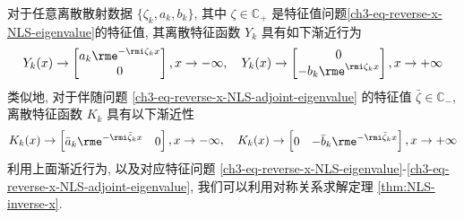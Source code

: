 对于任意离散散射数据 $ \{ \zeta_{k}, a_{k}, b_{k} \} $, 其中 $ \zeta \in \mathbb{C_{+}} $ 是特征值问题\eqref{ch3-eq-reverse-x-NLS-eigenvalue}的特征值, 其离散特征函数 $ Y_{k} $ 具有如下渐近行为
\begin{equation}
    Y_{k}(x) \to \begin{bmatrix} a_{k} \rme^{-\rmi \zeta_{k} x} \\ 0 \end{bmatrix}, x \to -\infty, \quad Y_{k}(x) \to \begin{bmatrix} 0 \\ -b_{k} \rme^{\rmi \zeta_{k} x} \end{bmatrix}, x \to +\infty \label{ch3-eq-large-x-asymptotics-of-reverse-x-NLS-eigenfunction}
\end{equation}
类似地, 对于伴随问题 \eqref{ch3-eq-reverse-x-NLS-adjoint-eigenvalue} 的特征值 $ \bar{\zeta} \in \mathbb{C_{-}} $, 离散特征函数 $ K_{k} $ 具有以下渐近性
\begin{equation}
    K_{k}(x) \to \begin{bmatrix} \bar{a}_{k} \rme^{-\rmi \bar{\zeta}_{k} x} & 0 \end{bmatrix}, x \to -\infty, \quad K_{k}(x) \to \begin{bmatrix} 0 & -\bar{b}_{k}\rme^{-\rmi \bar{\zeta}_{k}x} \end{bmatrix}, x \to +\infty \label{ch3-eq-large-x-asymptotics-of-reverse-x-NLS-adjoint-eigenfunction}
\end{equation}
利用上面渐近行为, 以及对应特征问题 \eqref{ch3-eq-reverse-x-NLS-eigenvalue}-\eqref{ch3-eq-reverse-x-NLS-adjoint-eigenvalue}, 我们可以利用对称关系求解定理 \ref{thm:NLS-inverse-x}.

